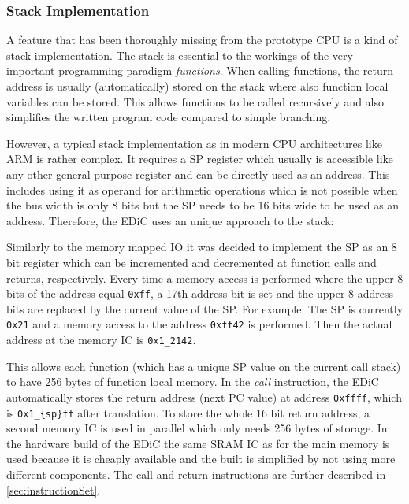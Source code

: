 \subsubsection{Stack Implementation}\label{sec:stack}
A feature that has been thoroughly missing from the prototype \gls{CPU} is a kind of stack implementation.
The stack is essential to the workings of the very important programming paradigm \emph{functions}.
When calling functions, the return address is usually (automatically) stored on the stack where also function local variables can be stored.
This allows functions to be called recursively and also simplifies the written program code compared to simple branching.

However, a typical stack implementation as in modern \gls{CPU} architectures like ARM is rather complex.
It requires a \gls{SP} register which usually is accessible like any other general purpose register and can be directly used as an address.
This includes using it as operand for arithmetic operations which is not possible when the bus width is only 8 bits but the \gls{SP} needs to be 16 bits wide to be used as an address.
Therefore, the \gls{EDiC} uses an unique approach to the stack:

Similarly to the memory mapped \gls{IO} it was decided to implement the \gls{SP} as an 8 bit register which can be incremented and decremented at function calls and returns, respectively.
Every time a memory access is performed where the upper 8 bits of the address equal \texttt{0xff}, a 17th address bit is set and the upper 8 address bits are replaced by the current value of the \gls{SP}.
For example: The \gls{SP}  is currently \texttt{0x21} and a memory access to the address \texttt{0xff42} is performed.
Then the actual address at the memory \gls{IC} is \texttt{0x1\_2142}.

This allows each function (which has a unique \gls{SP} value on the current call stack) to have 256 bytes of function local memory.
In the \emph{call} instruction, the \gls{EDiC} automatically stores the return address (next \gls{PC} value) at address \texttt{0xffff}, which is \texttt{0x1\_\{sp\}ff} after translation.
To store the whole 16 bit return address, a second memory \gls{IC} is used in parallel which only needs 256 bytes of storage.
In the hardware build of the \gls{EDiC} the same \gls{SRAM} \gls{IC} as for the main memory is used because it is cheaply available and the built is simplified by not using more different components.
The call and return instructions are further described in \cref{sec:instructionSet}.

